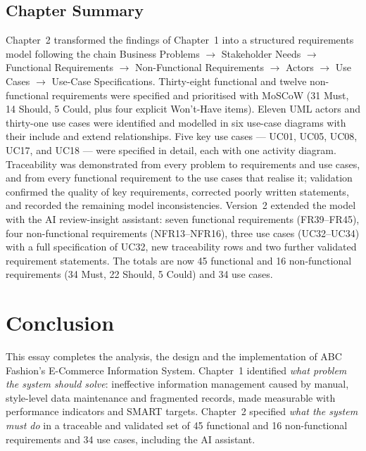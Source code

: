 \documentclass[11pt,a4paper,oneside]{extreport}
\newif\ifshowvtwo
\newcommand{\upd}[1]{\ifshowvtwo\textcolor{red}{#1}\else#1\fi}
\begin{document}
\section{Chapter Summary}
Chapter~2 transformed the findings of Chapter~1 into a structured requirements model following the chain Business Problems $\rightarrow$ Stakeholder Needs $\rightarrow$ Functional Requirements $\rightarrow$ Non-Functional Requirements $\rightarrow$ Actors $\rightarrow$ Use Cases $\rightarrow$ Use-Case Specifications. Thirty-eight functional and twelve non-functional requirements were specified and prioritised with MoSCoW (31 Must, 14 Should, 5 Could, plus four explicit Won't-Have items). Eleven UML actors and thirty-one use cases were identified and modelled in six use-case diagrams with their include and extend relationships. Five key use cases --- UC01, UC05, UC08, UC17, and UC18 --- were specified in detail, each with one activity diagram. Traceability was demonstrated from every problem to requirements and use cases, and from every functional requirement to the use cases that realise it; validation confirmed the quality of key requirements, corrected poorly written statements, and recorded the remaining model inconsistencies. \upd{Version~2 extended the model with the AI review-insight assistant: seven functional requirements (FR39--FR45), four non-functional requirements (NFR13--NFR16), three use cases (UC32--UC34) with a full specification of UC32, new traceability rows and two further validated requirement statements. The totals are now 45 functional and 16 non-functional requirements (34 Must, 22 Should, 5 Could) and 34 use cases.}




\fussy

\chapter*{Conclusion}

This essay completes the analysis, the design and the implementation of ABC Fashion's E-Commerce Information System. Chapter~1 identified \emph{what problem the system should solve}: ineffective information management caused by manual, style-level data maintenance and fragmented records, made measurable with performance indicators and SMART targets. Chapter~2 specified \emph{what the system must do} in a traceable and validated set of 45 functional and 16 non-functional requirements and 34 use cases, including the AI assistant.
\end{document}
